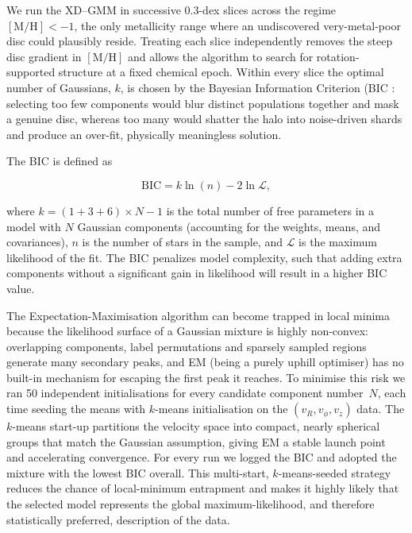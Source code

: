 \documentclass[a4paper,12pt]{article}
\begin{document}
We run the XD–GMM in successive 0.3-dex slices across the regime
\([\mathrm{M/H}]<-1\), the only metallicity range where an undiscovered
very-metal-poor disc could plausibly reside.  Treating each slice
independently removes the steep disc gradient in \([\mathrm{M/H}]\) and allows the
algorithm to search for rotation-supported structure at a fixed chemical
epoch.  Within every slice the optimal number of Gaussians, \(k\), is chosen
by the Bayesian Information Criterion (BIC \citealt{Schwarz1978}: selecting too few components
would blur distinct populations together and mask a genuine disc,
whereas too many would shatter the halo into noise-driven shards and
produce an over-fit, physically meaningless solution.

The BIC is defined as

\begin{equation}
\mathrm{BIC} = k \ln(n) - 2 \ln \mathcal{L},
\end{equation}

where $k = (1 + 3 + 6) \times N - 1$ is the total number of free parameters in a model with $N$ Gaussian components 
(accounting for the weights, means, and covariances), $n$ is the number of stars in the sample, and $\mathcal{L}$ 
is the maximum likelihood of the fit. The BIC penalizes model complexity, such that adding extra components 
without a significant gain in likelihood will result in a higher BIC value.

The Expectation-Maximisation algorithm can become trapped in local minima
because the likelihood surface of a Gaussian mixture is highly
non-convex: overlapping components, label permutations and sparsely sampled
regions generate many secondary peaks, and EM (being a purely uphill
optimiser) has no built-in mechanism for escaping the first peak it reaches.
To minimise this risk we ran 50 independent initialisations for every
candidate component number~\(N\), each time seeding the means with
\(k\)-means initialisation on the \((v_R,v_\phi,v_z)\) data.  The \(k\)-means start-up
partitions the velocity space into compact, nearly spherical groups that match
the Gaussian assumption, giving EM a stable launch point and accelerating
convergence.  For every run we logged the BIC
and adopted the mixture with the lowest BIC overall.  This multi-start,
\(k\)-means-seeded strategy reduces the chance of local-minimum
entrapment and makes it highly likely that the selected model represents the
global maximum-likelihood, and therefore statistically preferred, description of
the data.
\end{document}

